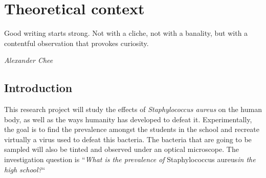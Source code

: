 \chapter{Theoretical context}
\epigraph{Good writing starts strong. Not with a cliche, not with a banality, but with a contentful observation that provokes curiosity.}{\textit{Alexander Chee}}
\section{Introduction}
This research project will study the effects of \emph{Staphylococcus aureus} on the human body, as well as the ways humanity has developed to defeat it. Experimentally, the goal is to find the prevalence amongst the students in the school and recreate virtually a virus used to defeat this bacteria. The bacteria that are going to be sampled will also be tinted and observed under an optical microscope.\newline
The investigation question is ``\emph{What is the prevalence of} Staphylococcus aureus\emph{in the high school?}``
